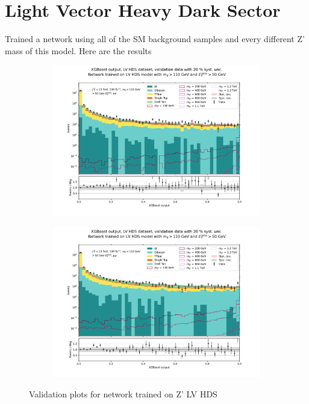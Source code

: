 \documentclass[14pt, a4paper]{book}
\begin{document}
\newpage
\section{Light Vector Heavy Dark Sector}
Trained a network using all of the SM background samples and every different Z' mass of this model. Here are the results
\begin{figure}[!ht]
	\centering
	\begin{subfigure}[b]{0.49\textwidth}
      \centering
      \includegraphics[width=1\textwidth]{XGBoost/LV_HDS/VAL_ee.pdf}
      \end{subfigure}
   \hfill
   \begin{subfigure}[b]{0.49\textwidth}
      \centering
      \includegraphics[width=1\textwidth]{XGBoost/LV_HDS/VAL_uu.pdf}
      \end{subfigure}
   \caption{Validation plots for network trained on Z' LV HDS}\label{fig:LV_HDS_vals}
\end{figure}
\end{document}
